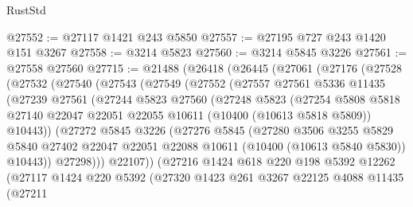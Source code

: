 \begin{lexlean}{RustStd}
\begin{coremodule}
{\begin{coremodule}
{{{{{{{{{{{{{{{{{{{{{{{{{@27552 := @27117 @1421 @243 @5850
@27557 := @27195 @727 @243 @1420 @151 @3267
@27558 := @3214 @5823
@27560 := @3214 @5845 @3226
@27561 := @27558 @27560
@27715 := @21488
    (@26418
      (@26445
        (@27061
          (@27176
            (@27528
              (@27532
                (@27540
                  (@27543
                    (@27549
                      (@27552
                        (@27557
                          @27561
                          @5336
                          @11435
                          (@27239
                            @27561
                            (@27244
                              @5823
                              @27560
                              (@27248
                                @5823
                                (@27254
                                  @5808
                                  @5818
                                  @27140
                                  @22047
                                  @22051
                                  @22055
                                  @10611
                                  (@10400 (@10613 @5818 @5809))
                                  @10443))
                              (@27272
                                @5845
                                @3226
                                (@27276
                                  @5845
                                  (@27280
                                    @3506
                                    @3255
                                    @5829
                                    @5840
                                    @27402
                                    @22047
                                    @22051
                                    @22088
                                    @10611
                                    (@10400 (@10613 @5840 @5830))
                                    @10443))
                                @27298)))
                          @22107))
                      (@27216
                        @1424
                        @618
                        @220
                        @198
                        @5392
                        @12262
                        (@27117
                          @1424
                          @220
                          @5392
                          (@27320
                            @1423
                            @261
                            @3267
                            @22125
                            @4088
                            @11435
                            (@27211
}}}}}}}}}}}}}}}}}}}}}}}}}
\end{coremodule}}
\end{coremodule}
\end{lexlean}
